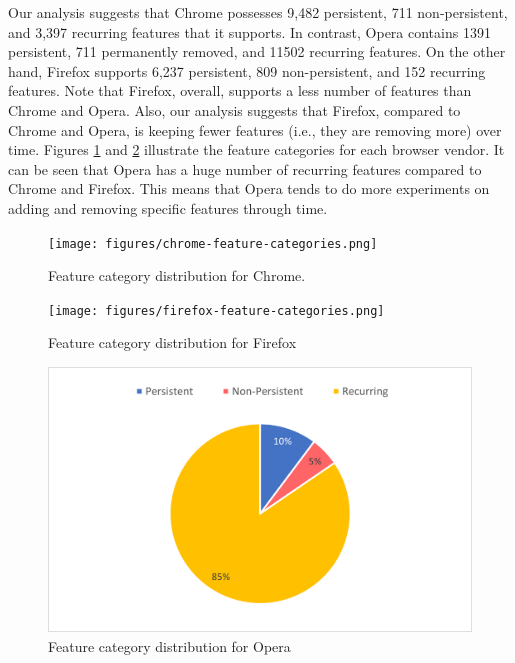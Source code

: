 Our analysis suggests that Chrome possesses 9,482 persistent, 711
non-persistent, and 3,397 recurring features that it supports. In contrast,
Opera contains 1391 persistent, 711 permanently removed, and 11502 recurring
features. On the other hand, Firefox supports 6,237 persistent, 809 non-persistent, and
152 recurring features. Note that Firefox, overall, supports a less
number of features than Chrome and Opera. Also, our analysis suggests that Firefox,
compared to Chrome and Opera, is keeping fewer features (i.e., they are removing
more) over time. Figures \ref{fig:chrome-categories} and
\ref{fig:firefox-categories} illustrate the feature categories for
each browser vendor. It can be seen that Opera has a huge number of recurring features
compared to Chrome and Firefox. This means that Opera tends to do more experiments
on adding and removing specific features through time.

\begin{figure}[ht]
    \centering
    \texttt{[image: figures/chrome-feature-categories.png]}
    \caption{Feature category distribution for Chrome.}
    \label{fig:chrome-categories}
\end{figure}

\begin{figure}[ht]
    \centering
    \texttt{[image: figures/firefox-feature-categories.png]}
    \caption{Feature category distribution for Firefox}
    \label{fig:firefox-categories}
  \end{figure}


  \begin{figure}[ht]
    \centering
    \includegraphics[width=\columnwidth]{figures/opera-feature-categories.png}
    \caption{Feature category distribution for Opera}
    \label{fig:opera-categories}
  \end{figure}

